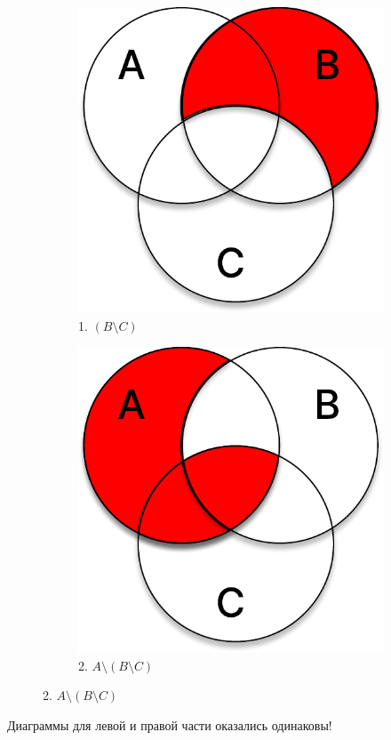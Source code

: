 \documentclass[11pt]{article}
\begin{document}
\begin{figure}[h]
	\captionsetup[subfigure]{labelformat=empty}
	\centering
	\begin{subfigure}{.32\textwidth}
		\centering
		\includegraphics[width=1\linewidth]{t3_2_1.pdf}
		\caption{1. $(B \setminus C)$}
	\end{subfigure}
	\begin{subfigure}{.32\textwidth}
		\centering
		\includegraphics[width=1\linewidth]{t3_2_2.pdf}
		\caption{2. $A \setminus (B \setminus C)$}
	\end{subfigure}
\end{figure}

Диаграммы для левой и правой части оказались одинаковы!
\end{document}
